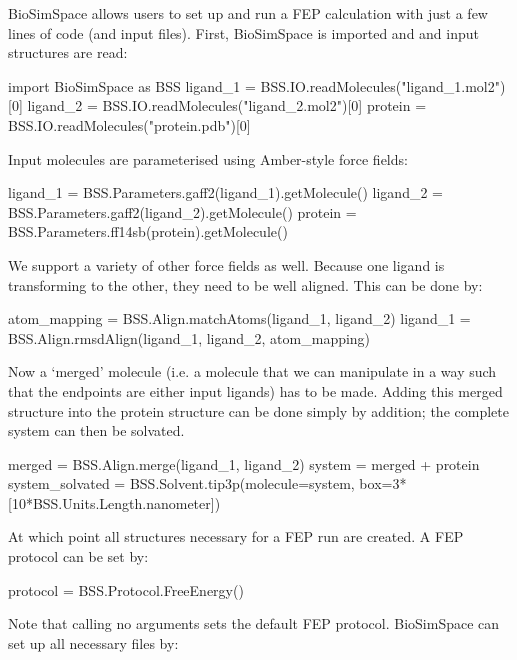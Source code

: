 BioSimSpace allows users to set up and run a FEP calculation with just a
few lines of code (and input files). First, BioSimSpace is imported and
and input structures are read:

\begin{python}
import BioSimSpace as BSS
ligand_1 = BSS.IO.readMolecules("ligand_1.mol2")[0]
ligand_2 = BSS.IO.readMolecules("ligand_2.mol2")[0]
protein = BSS.IO.readMolecules("protein.pdb")[0]
\end{python}

\noindent Input molecules are parameterised using Amber-style force fields:

\begin{python}
ligand_1 = BSS.Parameters.gaff2(ligand_1).getMolecule()
ligand_2 = BSS.Parameters.gaff2(ligand_2).getMolecule()
protein = BSS.Parameters.ff14sb(protein).getMolecule()
\end{python}

\noindent We support a variety of other force fields as well. Because one ligand is transforming to the other, they need to be
well aligned. This can be done by:

\begin{python}
atom_mapping = BSS.Align.matchAtoms(ligand_1, ligand_2)
ligand_1 = BSS.Align.rmsdAlign(ligand_1, ligand_2, 
                                     atom_mapping)
\end{python}

\noindent Now a `merged' molecule (i.e. a molecule that we can
manipulate in a way such that the endpoints are either input ligands) has to be made. Adding this merged structure into the protein structure can be done simply by addition; the complete system can then be solvated.

\begin{python}
merged = BSS.Align.merge(ligand_1, ligand_2)
system = merged + protein
system_solvated = BSS.Solvent.tip3p(molecule=system, 
                box=3*[10*BSS.Units.Length.nanometer])
\end{python}

\noindent At which point all structures necessary for a FEP run are created. A FEP protocol can be set by:

\begin{python}
protocol = BSS.Protocol.FreeEnergy()
\end{python}

\noindent Note that calling no arguments sets the default FEP protocol. BioSimSpace can set up all necessary files by:

